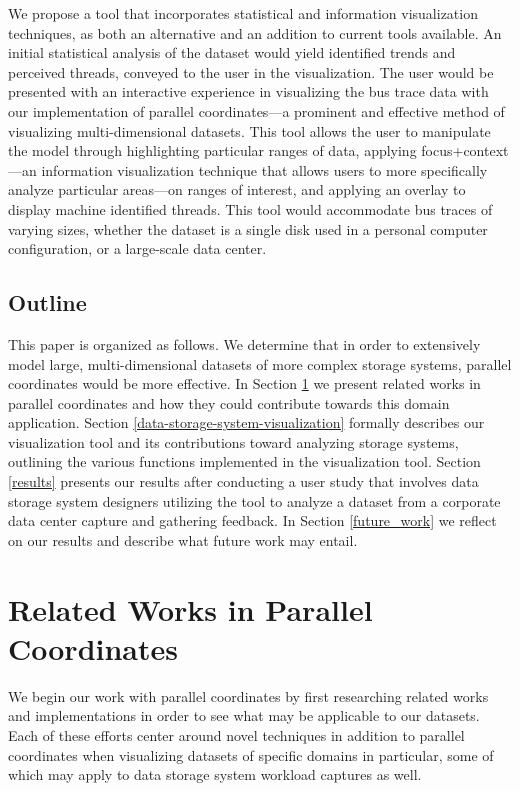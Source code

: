 \documentclass[journal]{vgtc}                %
\begin{document}
We propose a tool that incorporates statistical and information visualization techniques, as both an alternative and an addition to current tools available.  An initial statistical analysis of the dataset would yield identified trends and perceived threads, conveyed to the user in the visualization. The user would be presented with an interactive experience in visualizing the bus trace data with our implementation of parallel coordinates---a prominent and effective method of visualizing multi-dimensional datasets. This tool allows the user to manipulate the model through highlighting particular ranges of data,  applying focus+context---an information visualization technique that allows users to more specifically analyze particular areas---on ranges of interest, and applying an overlay to display machine identified threads.  This tool would accommodate bus traces of varying sizes, whether the dataset is a single disk used in a personal computer configuration, or a large-scale data center.

\subsection{Outline}
\label{outline}
This paper is organized as follows. We determine that in order to extensively model large, multi-dimensional datasets of more complex storage systems, parallel coordinates would be more effective. In Section \ref{related-works} we present related works in parallel coordinates and how they could contribute towards this domain application. Section \ref{data-storage-system-visualization} formally describes our visualization tool and its contributions toward analyzing storage systems, outlining the various functions implemented in the visualization tool. Section \ref{results} presents our results after conducting a user study that involves data storage system designers utilizing the tool to analyze a dataset from a corporate data center capture and gathering feedback. In Section \ref{future_work} we reflect on our results and describe what future work may entail.

\section{Related Works in Parallel Coordinates}
\label{related-works}

We begin our work with parallel coordinates by first researching related works and implementations in order to see what may be applicable to our datasets. Each of these efforts center around novel techniques in addition to parallel coordinates when visualizing datasets of specific domains in particular, some of which may apply to data storage system workload captures as well.
\end{document}
